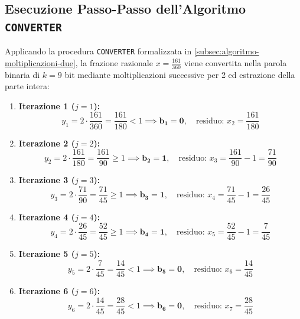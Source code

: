 \FloatBarrier
\subsection[Esecuzione Passo-Passo di CONVERTER]{Esecuzione Passo-Passo dell'Algoritmo \texttt{CONVERTER}}
\label{subsec:traccia-converter-9bit}

Applicando la procedura \texttt{CONVERTER} formalizzata in \autoref{subsec:algoritmo-moltiplicazioni-due}, la frazione razionale $x = \frac{161}{360}$ viene convertita nella parola binaria di $k = 9$ bit mediante moltiplicazioni successive per 2 ed estrazione della parte intera:

\begin{enumerate}
  \item \textbf{Iterazione 1 ($j = 1$):}
  \begin{equation}
    y_1 = 2 \cdot \frac{161}{360} = \frac{161}{180} < 1 \implies \mathbf{b_1 = 0}, \quad \text{residuo: } x_2 = \frac{161}{180}
  \end{equation}
  \item \textbf{Iterazione 2 ($j = 2$):}
  \begin{equation}
    y_2 = 2 \cdot \frac{161}{180} = \frac{161}{90} \ge 1 \implies \mathbf{b_2 = 1}, \quad \text{residuo: } x_3 = \frac{161}{90} - 1 = \frac{71}{90}
  \end{equation}
  \item \textbf{Iterazione 3 ($j = 3$):}
  \begin{equation}
    y_3 = 2 \cdot \frac{71}{90} = \frac{71}{45} \ge 1 \implies \mathbf{b_3 = 1}, \quad \text{residuo: } x_4 = \frac{71}{45} - 1 = \frac{26}{45}
  \end{equation}
  \item \textbf{Iterazione 4 ($j = 4$):}
  \begin{equation}
    y_4 = 2 \cdot \frac{26}{45} = \frac{52}{45} \ge 1 \implies \mathbf{b_4 = 1}, \quad \text{residuo: } x_5 = \frac{52}{45} - 1 = \frac{7}{45}
  \end{equation}
  \item \textbf{Iterazione 5 ($j = 5$):}
  \begin{equation}
    y_5 = 2 \cdot \frac{7}{45} = \frac{14}{45} < 1 \implies \mathbf{b_5 = 0}, \quad \text{residuo: } x_6 = \frac{14}{45}
  \end{equation}
  \item \textbf{Iterazione 6 ($j = 6$):}
  \begin{equation}
    y_6 = 2 \cdot \frac{14}{45} = \frac{28}{45} < 1 \implies \mathbf{b_6 = 0}, \quad \text{residuo: } x_7 = \frac{28}{45}

\end{equation}
\end{enumerate}
